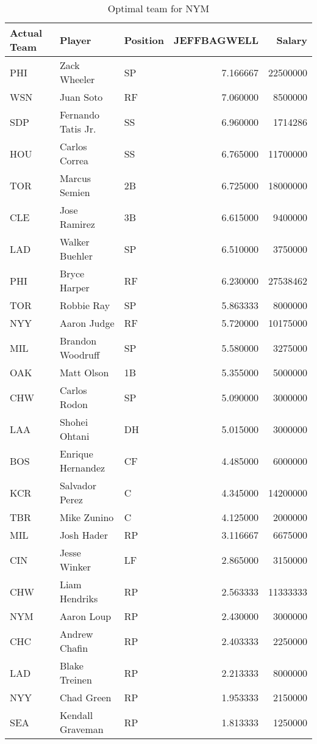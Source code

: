 \begin{table}

\caption{Optimal team for NYM}
\centering
\begin{tabular}[t]{l|l|l|r|r}
\hline
Actual Team & Player & Position & JEFFBAGWELL & Salary\\
\hline
PHI & Zack Wheeler & SP & 7.166667 & 22500000\\
\hline
WSN & Juan Soto & RF & 7.060000 & 8500000\\
\hline
SDP & Fernando Tatis Jr. & SS & 6.960000 & 1714286\\
\hline
HOU & Carlos Correa & SS & 6.765000 & 11700000\\
\hline
TOR & Marcus Semien & 2B & 6.725000 & 18000000\\
\hline
CLE & Jose Ramirez & 3B & 6.615000 & 9400000\\
\hline
LAD & Walker Buehler & SP & 6.510000 & 3750000\\
\hline
PHI & Bryce Harper & RF & 6.230000 & 27538462\\
\hline
TOR & Robbie Ray & SP & 5.863333 & 8000000\\
\hline
NYY & Aaron Judge & RF & 5.720000 & 10175000\\
\hline
MIL & Brandon Woodruff & SP & 5.580000 & 3275000\\
\hline
OAK & Matt Olson & 1B & 5.355000 & 5000000\\
\hline
CHW & Carlos Rodon & SP & 5.090000 & 3000000\\
\hline
LAA & Shohei Ohtani & DH & 5.015000 & 3000000\\
\hline
BOS & Enrique Hernandez & CF & 4.485000 & 6000000\\
\hline
KCR & Salvador Perez & C & 4.345000 & 14200000\\
\hline
TBR & Mike Zunino & C & 4.125000 & 2000000\\
\hline
MIL & Josh Hader & RP & 3.116667 & 6675000\\
\hline
CIN & Jesse Winker & LF & 2.865000 & 3150000\\
\hline
CHW & Liam Hendriks & RP & 2.563333 & 11333333\\
\hline
NYM & Aaron Loup & RP & 2.430000 & 3000000\\
\hline
CHC & Andrew Chafin & RP & 2.403333 & 2250000\\
\hline
LAD & Blake Treinen & RP & 2.213333 & 8000000\\
\hline
NYY & Chad Green & RP & 1.953333 & 2150000\\
\hline
SEA & Kendall Graveman & RP & 1.813333 & 1250000\\
\hline
\end{tabular}
\end{table}
